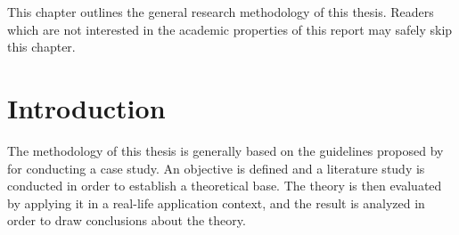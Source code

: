 
This chapter outlines the general research methodology of this thesis.
Readers which are not interested in the academic properties of this
report may safely skip this chapter.\\

\section{Introduction}
The methodology of this thesis is generally based on the guidelines
proposed by \citet{article:casestudies} for conducting a case study.
An objective is defined and a literature study is conducted in
order to establish a theoretical base. The theory is then evaluated by
applying it in a real-life application context, and the result is
analyzed in order to draw conclusions about the theory.
